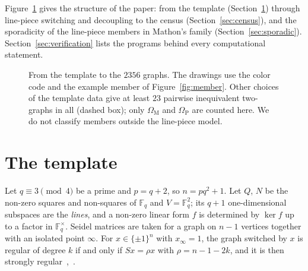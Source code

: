 \documentclass[11pt]{amsart}
\theoremstyle{definition}
\theoremstyle{remark}
\newcommand{\F}{\mathbb{F}}
\newcommand{\OM}{\Omega_{\mathrm M}}   %
\newcommand{\OP}{\Omega_{\mathrm P}}   %
\begin{document}
Figure~\ref{fig:flow} gives the structure of the paper: from the template (Section~\ref{sec:template}) through
line-piece switching and decoupling to the census (Section~\ref{sec:census}), and the sporadicity of the line-piece
members in Mathon's family (Section~\ref{sec:sporadic}). Section~\ref{sec:verification} lists the programs behind every
computational statement.

\begin{figure}[t]
\centering
\resizebox{0.95\textwidth}{!}{}
\caption{From the template to the $2356$ graphs.
The drawings use the color code and the example member of Figure~\ref{fig:member}.
Other choices of the template data give at least $23$ pairwise inequivalent two-graphs in all (dashed box); only $\OM$
\cite{Mathon1978} and $\OP$ are counted here. We do not classify members outside the line-piece model.}
\label{fig:flow}
\end{figure}

\section{The template}\label{sec:template}

Let $q\equiv3\pmod4$ be a prime and $p=q+2$, so $n=pq^2+1$. Let $Q$, $N$ be the non-zero squares and non-squares of $\F_q$
and $V=\F_q^2$; its $q+1$ one-dimensional subspaces are the \emph{lines}, and a non-zero linear form $f$ is determined by
$\ker f$ up to a factor in $\F_q^\times$. Seidel matrices are taken for a graph on $n-1$ vertices together with an isolated
point $\infty$. For $x\in\{\pm1\}^n$ with $x_\infty=1$, the graph switched by $x$ is regular of degree $k$ if and only if
$Sx=\rho x$ with $\rho=n-1-2k$, and it is then strongly regular~\cite{Seidel1976,Taylor1977},~\cite[\S10.3]{BH2012}.
\end{document}
